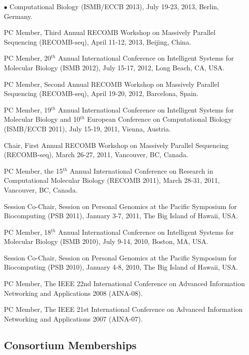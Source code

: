 \documentclass[margin,line]{res}
\newenvironment{list2}{
  \begin{list}{$\bullet$}{%
      \setlength{\itemsep}{0in}
      \setlength{\parsep}{0in} \setlength{\parskip}{0in}
      \setlength{\topsep}{0in} \setlength{\partopsep}{0in} 
      \setlength{\leftmargin}{0.2in}}}{\end{list}}
\begin{document}
\begin{resume}
\begin{list2}
  Computational Biology  (ISMB/ECCB 2013), 
  July 19-23, 2013, Berlin, Germany.
\item
  PC Member, Third Annual RECOMB Workshop on Massively Parallel Sequencing (RECOMB-seq), April 11-12, 2013, Beijing, China.
\item
  PC Member, 20$^{th}$ Annual International Conference on Intelligent Systems for Molecular Biology
  (ISMB 2012), July 15-17, 2012, Long Beach, CA, USA. 
\item
  PC Member, Second Annual RECOMB Workshop on Massively Parallel Sequencing (RECOMB-seq), April 19-20, 2012, Barcelona, Spain.
\clearpage
\item
  PC Member, 19$^{th}$ Annual International Conference on Intelligent Systems for Molecular Biology
  and 10$^{th}$ European Conference on Computational Biology 
  (ISMB/ECCB 2011), July 15-19, 2011, Vienna, Austria.
\item
  Chair, First Annual RECOMB Workshop on Massively Parallel Sequencing (RECOMB-seq), March 26-27, 2011, Vancouver, BC, Canada.
\item
  PC Member, the 15$^{th}$ Annual International Conference on Research in Computational Molecular Biology
  (RECOMB 2011), March 28-31, 2011, Vancouver, BC, Canada.
\item 
  Session Co-Chair, Session on Personal Genomics at the Pacific Symposium for Biocomputing (PSB 2011),
  January 3-7, 2011, The Big Island of Hawaii, USA.
\item
  PC Member, 18$^{th}$ Annual International Conference on Intelligent Systems for Molecular Biology
  (ISMB 2010), July 9-14, 2010, Boston, MA, USA.
\item 
  Session Co-Chair, Session on Personal Genomics at the Pacific Symposium for Biocomputing (PSB 2010),
  January 4-8, 2010, The Big Island of Hawaii, USA.
\item
  PC Member, The IEEE 22nd International Conference on
  Advanced Information Networking and Applications 2008 (AINA-08).
\item
  PC Member, The IEEE 21st International Conference on
  Advanced Information Networking and Applications 2007 (AINA-07).
\end{list2}


\vspace{-0.6cm}
\subsection{\small \sc Consortium Memberships}


\end{resume}
\end{document}
